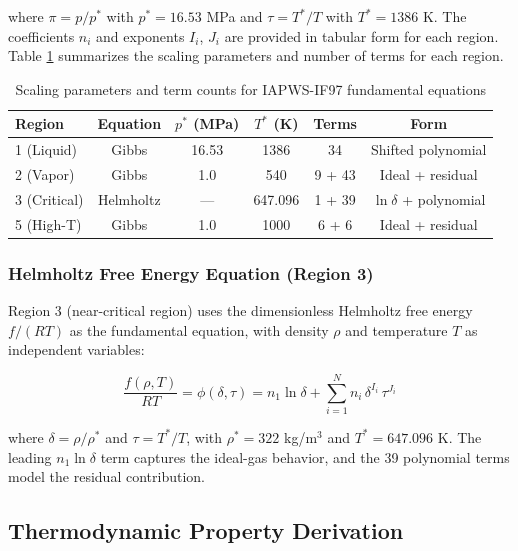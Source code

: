 \documentclass{article}
\begin{document}
where $\pi = p/p^{*}$ with $p^{*} = 16.53$ MPa and $\tau = T^{*}/T$ with $T^{*} = 1386$ K. The coefficients $n_i$ and exponents $I_i$, $J_i$ are provided in tabular form for each region. Table \ref{tab:region_params} summarizes the scaling parameters and number of terms for each region.

\begin{table}[H]
\centering
\caption{Scaling parameters and term counts for IAPWS-IF97 fundamental equations}
\label{tab:region_params}
\begin{tabular}{lccccc}
\toprule
\textbf{Region} & \textbf{Equation} & \textbf{$p^{*}$ (MPa)} & \textbf{$T^{*}$ (K)} & \textbf{Terms} & \textbf{Form} \\
\midrule
1 (Liquid) & Gibbs & 16.53 & 1386 & 34 & Shifted polynomial \\
2 (Vapor) & Gibbs & 1.0 & 540 & 9 + 43 & Ideal + residual \\
3 (Critical) & Helmholtz & --- & 647.096 & 1 + 39 & $\ln\delta$ + polynomial \\
5 (High-T) & Gibbs & 1.0 & 1000 & 6 + 6 & Ideal + residual \\
\bottomrule
\end{tabular}
\end{table}

\subsubsection{Helmholtz Free Energy Equation (Region 3)}

Region 3 (near-critical region) uses the dimensionless Helmholtz free energy $f/(RT)$ as the fundamental equation, with density $\rho$ and temperature $T$ as independent variables:

\begin{equation}
\frac{f(\rho,T)}{RT} = \phi(\delta,\tau) = n_1 \ln\delta + \sum_{i=1}^{N} n_i \, \delta^{I_i} \, \tau^{J_i}
\label{eq:helmholtz}
\end{equation}

where $\delta = \rho/\rho^{*}$ and $\tau = T^{*}/T$, with $\rho^{*} = 322$ kg/m$^3$ and $T^{*} = 647.096$ K. The leading $n_1 \ln\delta$ term captures the ideal-gas behavior, and the 39 polynomial terms model the residual contribution.


\subsection{Thermodynamic Property Derivation}
\end{document}
